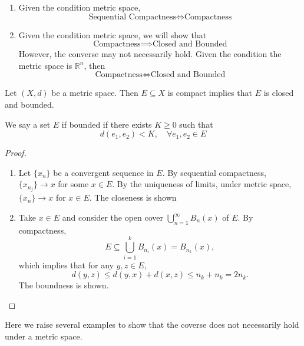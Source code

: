 \begin{remark}
\begin{enumerate}
\item
Given the condition metric space,
\[
\text{Sequential Compactness}
\Longleftrightarrow
\text{Compactness}
\]
\item
Given the condition metric space, we will show that 
\[
\text{Compactness}
\implies
\text{Closed and Bounded}
\]
However, the converse may not necessarily hold. Given the condition the metric space is $\mathbb{R}^n$, then
\[
\text{Compactness}
\Longleftrightarrow
\text{Closed and Bounded}
\]
\end{enumerate}


\end{remark}

\begin{proposition}
Let $(X,d)$ be a metric space. Then $E\subseteq X$ is compact implies that $E$ is closed and bounded.

We say a set $E$ if bounded if there exists $K\geq 0$ such that
\[
d(e_1,e_2) < K,\quad
\forall e_1, e_2 \in E
\]
\end{proposition}

\begin{proof}
\begin{enumerate}
\item
Let $\{x_n\}$ be a convergent sequence in $E$. By sequential compactness, $\{x_{n_j}\}\to x$ for some $x\in E$. By the uniqueness of limits, under metric space, $\{x_n\}\to x$ for $x\in E$. The closeness is shown
\item
Take $x\in E$ and consider the open cover $\bigcup_{n=1}^\infty B_n(x)$ of $E$. By compactness, 
\[
E\subseteq\bigcup_{i=1}^kB_{n_i}(x)=B_{n_k}(x),
\]
which implies that for any $y,z\in E$,
\[
d(y,z)\le d(y,x)+d(x,z)\le n_k+n_k=2n_k.
\]
The boundness is shown.
\end{enumerate}
\end{proof}

Here we raise several examples to show that the coverse does not necessarily hold under a metric space.

